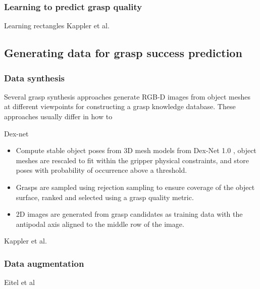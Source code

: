 
\subsubsection*{Learning to predict grasp quality}
Learning rectangles \cite{mahler2017,jiang2011,lenz2015}
Kappler et al. \cite{Kappler2015}


\subsection{Generating data for grasp success prediction}

\subsubsection{Data synthesis}
Several grasp synthesis approaches generate RGB-D images from object meshes at different viewpoints
\cite{mahler2017,Gupta2014RGBDFeatures,Kappler2015} for constructing a grasp knowledge database. These approaches
usually differ in how to 

Dex-net 
\begin{itemize}
    \item Compute stable object poses from 3D mesh models from Dex-Net 1.0 \cite{mahler2016}, object meshes are rescaled
    to fit within the gripper physical constraints, and store poses with probability of occurrence above a threshold.
    \item Grasps are sampled using rejection sampling to ensure coverage of the object surface, ranked and selected
    using a grasp quality metric.
    \item 2D images are generated from grasp candidates as training data with the antipodal axis aligned to the middle
    row of the image.
\end{itemize}

Kappler et al. \cite{Kappler2015}

\subsubsection{Data augmentation}
Eitel et al \cite{Eitel2015}

\cite{Gupta2014RGBDFeatures}


